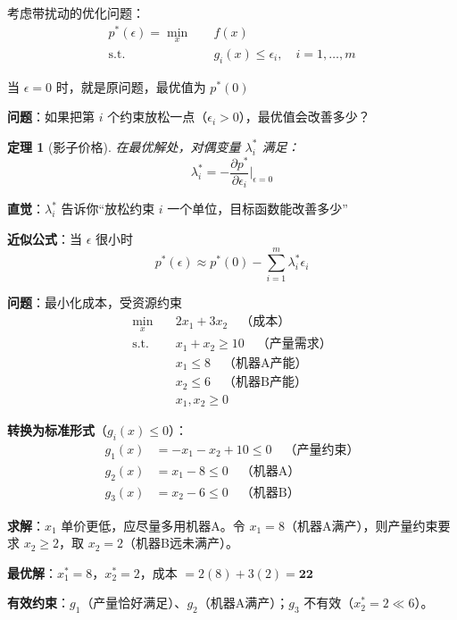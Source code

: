 \documentclass[12pt, a4paper]{ctexart}
\newtheorem{theorem}{定理}[section]
\begin{document}
\begin{blackboard}

考虑带扰动的优化问题：
\[
\begin{aligned}
p^*(\epsilon) = \min_x \quad & f(x) \\
\text{s.t.} \quad & g_i(x) \leq \epsilon_i, \quad i = 1, \ldots, m
\end{aligned}
\]

当 $\epsilon = 0$ 时，就是原问题，最优值为 $p^*(0)$

\textbf{问题}：如果把第 $i$ 个约束放松一点（$\epsilon_i > 0$），最优值会改善多少？

\end{blackboard}

\begin{blackboard}[影子价格定理]

\begin{theorem}[影子价格]
在最优解处，对偶变量 $\lambda_i^*$ 满足：
\[
\lambda_i^* = -\frac{\partial p^*}{\partial \epsilon_i} \bigg|_{\epsilon = 0}
\]
\end{theorem}

\textbf{直觉}：$\lambda_i^*$ 告诉你``放松约束 $i$ 一个单位，目标函数能改善多少''

\textbf{近似公式}：当 $\epsilon$ 很小时
\[
p^*(\epsilon) \approx p^*(0) - \sum_{i=1}^m \lambda_i^* \epsilon_i
\]

\end{blackboard}

\begin{blackboard}

\textbf{问题}：最小化成本，受资源约束
\[
\begin{aligned}
\min_x \quad & 2x_1 + 3x_2 \quad \text{（成本）} \\
\text{s.t.} \quad & x_1 + x_2 \geq 10 \quad \text{（产量需求）} \\
& x_1 \leq 8 \quad \text{（机器A产能）} \\
& x_2 \leq 6 \quad \text{（机器B产能）} \\
& x_1, x_2 \geq 0
\end{aligned}
\]

\textbf{转换为标准形式}（$g_i(x) \leq 0$）：
\begin{align*}
g_1(x) &= -x_1 - x_2 + 10 \leq 0 \quad \text{（产量约束）} \\
g_2(x) &= x_1 - 8 \leq 0 \quad \text{（机器A）} \\
g_3(x) &= x_2 - 6 \leq 0 \quad \text{（机器B）}
\end{align*}

\textbf{求解}：$x_1$ 单价更低，应尽量多用机器A。令 $x_1=8$（机器A满产），则产量约束要求 $x_2 \geq 2$，取 $x_2=2$（机器B远未满产）。

\textbf{最优解}：$x_1^* = 8$，$x_2^* = 2$，成本 $= 2(8) + 3(2) = \mathbf{22}$

\textbf{有效约束}：$g_1$（产量恰好满足）、$g_2$（机器A满产）；$g_3$ 不有效（$x_2^*=2 \ll 6$）。

\end{blackboard}
\end{document}
